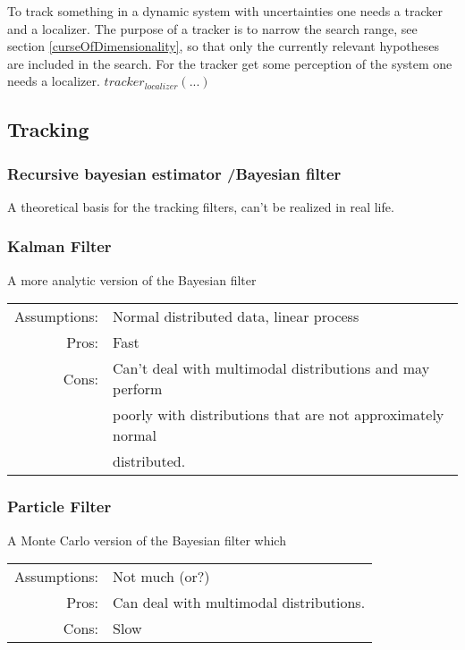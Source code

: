 
To track something in a dynamic system with uncertainties one needs a tracker and a localizer. The purpose of a tracker is to narrow the search range, see section \ref{curseOfDimensionality}, so that only the currently relevant hypotheses are included in the search. For the tracker get some perception of the system one needs a localizer. $tracker_{localizer}(...)$


\subsection{Tracking}
\subsubsection*{Recursive bayesian estimator /Bayesian filter}
A theoretical basis for the tracking filters, can't be realized in real life.
\subsubsection{Kalman Filter}
A more analytic version of the Bayesian filter

\begin{tabular}[h]{rl}
Assumptions: & Normal distributed data, linear process\\ %
Pros: & Fast\\
Cons: & Can't deal with multimodal distributions and may perform\\
& poorly with distributions that are not approximately normal\\
& distributed.
\end{tabular}

\subsubsection*{Particle Filter}
A Monte Carlo version of the Bayesian filter which 

\begin{tabular}[h]{rl}
  Assumptions: & Not much (or?)\\
  Pros: & Can deal with multimodal distributions.\\
  Cons: & Slow
\end{tabular}

